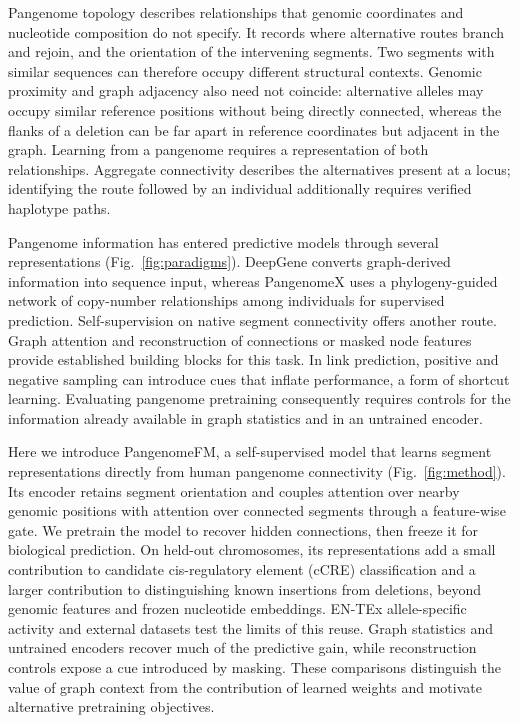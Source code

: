 \documentclass[11pt]{article}
\newcommand{\method}{PangenomeFM\xspace}
\begin{document}
\begin{bibunit}[unsrtnat]
Pangenome topology describes relationships that genomic coordinates and nucleotide composition do not specify. It records where alternative routes branch and rejoin, and the orientation of the intervening segments. Two segments with similar sequences can therefore occupy different structural contexts. Genomic proximity and graph adjacency also need not coincide: alternative alleles may occupy similar reference positions without being directly connected, whereas the flanks of a deletion can be far apart in reference coordinates but adjacent in the graph. Learning from a pangenome requires a representation of both relationships. Aggregate connectivity describes the alternatives present at a locus; identifying the route followed by an individual additionally requires verified haplotype paths.

Pangenome information has entered predictive models through several representations (Fig.~\ref{fig:paradigms}). DeepGene converts graph-derived information into sequence input\cite{zhang2025deepgene}, whereas PangenomeX uses a phylogeny-guided network of copy-number relationships among individuals for supervised prediction\cite{xue2025pangenomex}. Self-supervision on native segment connectivity offers another route. Graph attention\cite{velickovic2018gat} and reconstruction of connections or masked node features\cite{kipf2016vgae,hu2020strategies,hou2022graphmae} provide established building blocks for this task. In link prediction, positive and negative sampling can introduce cues that inflate performance\cite{li2023heart,dong2022fakeedge}, a form of shortcut learning\cite{geirhos2020shortcut}. Evaluating pangenome pretraining consequently requires controls for the information already available in graph statistics and in an untrained encoder.

Here we introduce \method, a self-supervised model that learns segment representations directly from human pangenome connectivity (Fig.~\ref{fig:method}). Its encoder retains segment orientation and couples attention over nearby genomic positions with attention over connected segments through a feature-wise gate. We pretrain the model to recover hidden connections, then freeze it for biological prediction. On held-out chromosomes, its representations add a small contribution to candidate cis-regulatory element (cCRE) classification and a larger contribution to distinguishing known insertions from deletions, beyond genomic features and frozen nucleotide embeddings. EN-TEx allele-specific activity\cite{rozowsky2023entex} and external datasets test the limits of this reuse. Graph statistics and untrained encoders recover much of the predictive gain, while reconstruction controls expose a cue introduced by masking. These comparisons distinguish the value of graph context from the contribution of learned weights and motivate alternative pretraining objectives.


\end{bibunit}
\end{document}
